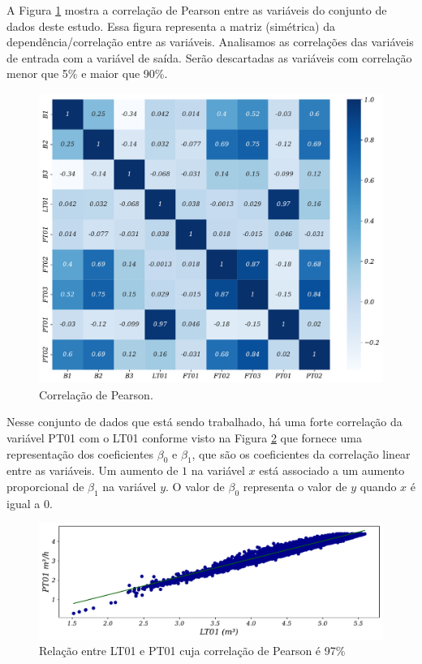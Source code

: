A Figura \ref{fig:person} mostra a correlação de Pearson entre as variáveis do conjunto de dados deste estudo. Essa figura representa a matriz (simétrica) da dependência/correlação entre as variáveis. Analisamos as correlações das variáveis de entrada com a variável de saída. Serão descartadas as variáveis com correlação menor que 5\% e maior que 90\%.

\begin{figure}[!htb]
	\centering
	\caption{Correlação de Pearson.}
	\label{fig:person}	\includegraphics[width=0.7\linewidth]{Resultados/Figuras/person}
		
\end{figure}

Nesse conjunto de dados que está sendo trabalhado, há uma forte correlação da variável PT01 com o LT01 conforme visto na Figura \ref{fig:lr-lt01-m3} que fornece uma representação dos coeficientes $\beta_0$ e $\beta_1$, que são os coeficientes da correlação linear entre as variáveis. Um aumento de $1$ na variável $x$ está associado a um aumento proporcional de $\beta_1$ na variável $y$. O valor de $\beta_0$ representa o valor de $y$ quando $x$ é igual a $0$.

\begin{figure}[!htb]
	\centering
	\caption{Relação entre LT01 e PT01 cuja correlação de Pearson é 97\%}
	\label{fig:lr-lt01-m3}
	\includegraphics[width=0.7\linewidth]{Resultados/Figuras/LR}
\end{figure}

